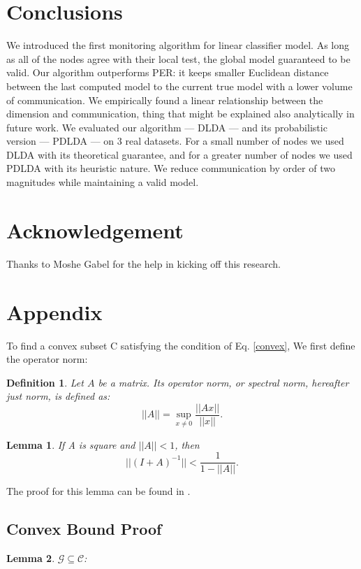 \documentclass[11pt,twocolumn,varwidth=true,a4paper,fleqn]{article}
\newtheorem{lemma}{Lemma}
\newtheorem{definition}{Definition}
\begin{document}
\section*{Conclusions}
We introduced the first monitoring algorithm for linear classifier model.
As long as all of the nodes agree with their local test, the
global model guaranteed to be valid. 
Our algorithm outperforms PER: it keeps smaller Euclidean distance between 
the last computed model to the current true model with a lower volume of
communication. 
We empirically found a linear relationship between the dimension and
communication, thing that might be explained also analytically 
in future work. 
We evaluated our algorithm --- DLDA --- and its probabilistic version --- PDLDA --- on 3 real datasets. For a small number of nodes we used 
DLDA with its theoretical guarantee, and for a greater number of nodes we used
PDLDA with its heuristic nature.
We reduce communication by order of two magnitudes while maintaining a 
valid model.
 \section*{Acknowledgement}
Thanks to Moshe Gabel for the help in kicking off this research.




\appendix
\section{Appendix} \label{AppendixA}
To find a convex subset C satisfying the condition of Eq. \ref{convex},
We first define the operator norm:
\begin{definition}
Let $A$ be a matrix. Its operator norm, or
spectral norm, hereafter just norm, is defined as:
\begin{equation*}
||A|| = \sup_{x \neq 0}\frac{||Ax||}{||x||}.
\end{equation*}
\end{definition}

\begin{lemma} \label{lemma:newman}
If A is square and $||A|| < 1$, then
\begin{equation*}
||(I+A)^{-1}|| < \frac{1}{1-||A||}.
\end{equation*}
\end{lemma}
The proof for this lemma can be found in \cite{gabel2015monitoring}.

\subsection{Convex Bound Proof}
\begin{lemma}
$\mathcal{G} \subseteq \mathcal{C}$:
\end{lemma}
\end{document}

